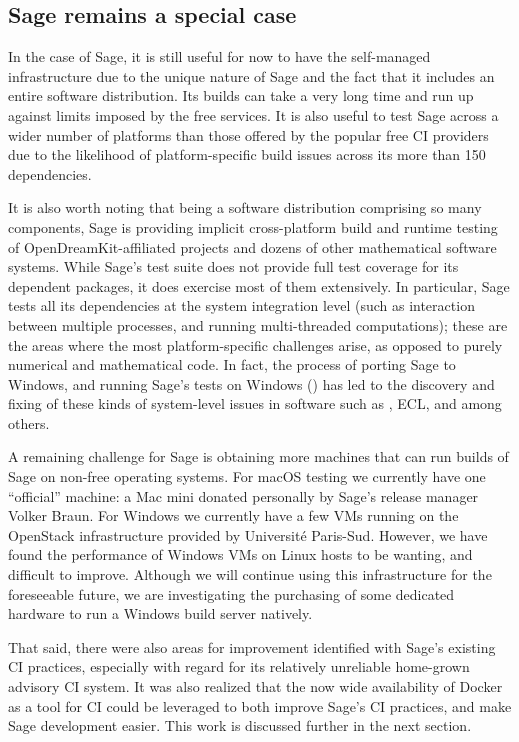 \documentclass{deliverablereport}
\begin{document}
\subsection{Sage remains a special case}
In the case of Sage, it is still useful for now to have the self-managed
infrastructure due to the unique nature of Sage and the fact that it includes
an entire software distribution.  Its builds can take a very long time and run
up against limits imposed by the free services.  It is also useful to test
Sage across a wider number of platforms than those offered by the popular free
CI providers due to the likelihood of platform-specific build issues across its
more than 150 dependencies.

It is also worth noting that being a software distribution comprising so many
components, Sage is providing implicit cross-platform build and runtime testing of
OpenDreamKit-affiliated projects and dozens of other mathematical software
systems.  While Sage's test suite does not provide full test coverage for its
dependent packages, it does exercise most of them extensively.  In particular,
Sage tests all its dependencies at the system integration level (such as
interaction between multiple processes, and running multi-threaded
computations); these are the areas where the most platform-specific challenges
arise, as opposed to purely numerical and mathematical code.  In fact, the
process of porting Sage to Windows, and running Sage's tests on Windows
() has led to the
discovery and fixing of these kinds of system-level issues in software such as
\GAP, ECL, and \PariGP among others.

A remaining challenge for Sage is obtaining more machines that can run builds
of Sage on non-free operating systems.  For macOS testing we currently have
one ``official'' machine: a Mac mini donated personally by Sage's release
manager Volker Braun. For Windows we currently have a few VMs running on the
OpenStack infrastructure provided by Universit\'e Paris-Sud.  However, we have
found the performance of Windows VMs on Linux hosts to be wanting, and
difficult to improve. Although we will continue using this infrastructure for
the foreseeable future, we are investigating the purchasing of some dedicated
hardware to run a Windows build server natively.

That said, there were also areas for improvement identified with Sage's
existing CI practices, especially with regard for its relatively unreliable
home-grown advisory CI system.  It was also realized that the now wide
availability of Docker as a tool for CI could be leveraged to both improve
Sage's CI practices, and make Sage development easier.  This work is discussed
further in the next section.
\end{document}
